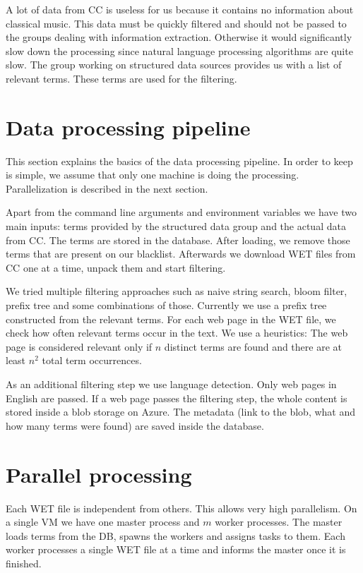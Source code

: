\documentclass[DIV=calc, paper=a4, fontsize=11pt, twocolumn]{scrartcl}
\begin{document}
A lot of data from CC is useless for us because it contains no information about classical music. 
This data must be quickly filtered and should not be passed to the groups dealing with information extraction. 
Otherwise it would significantly slow down the processing since natural language processing algorithms are quite slow. 
The group working on structured data sources provides us with a list of relevant terms. 
These terms are used for the filtering.


\section*{Data processing pipeline}
This section explains the basics of the data processing pipeline. 
In order to keep is simple, we assume that only one machine is doing the processing. 
Parallelization is described in the next section.

Apart from the command line arguments and environment variables we have two main inputs: 
terms provided by the structured data group and the actual data from CC. 
The terms are stored in the database. 
After loading, we remove those terms that are present on our blacklist. 
Afterwards we download WET files from CC one at a time, unpack them and start filtering.

We tried multiple filtering approaches such as naive string search, bloom filter, prefix tree and some combinations of those. 
Currently we use a prefix tree constructed from the relevant terms. 
For each web page in the WET file, we check how often relevant terms occur in the text. 
We use a heuristics: 
The web page is considered relevant only if $n$ distinct terms are found and there are at least $n^2$ total term occurrences.

As an additional filtering step we use language detection. 
Only web pages in English are passed. 
If a web page passes the filtering step, the whole content is stored inside a blob storage on Azure. 
The metadata (link to the blob, what and how many terms were found) are saved inside the database.


\section*{Parallel processing}
Each WET file is independent from others. 
This allows very high parallelism. 
On a single VM we have one master process and $m$ worker processes. 
The master loads terms from the DB, spawns the workers and assigns tasks to them. 
Each worker processes a single WET file at a time and informs the master once it is finished. 
\end{document}
